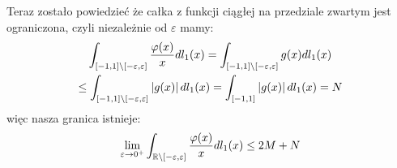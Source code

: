 \documentclass[11pt]{scrartcl}
\begin{document}
\begin{walk}
            Teraz zostało powiedzieć że całka z funkcji ciągłej na przedziale zwartym 
            jest ograniczona, czyli niezależnie od $\varepsilon$ mamy:
            \begin{gather*}
                \int_{[-1,1] \backslash [-\varepsilon, \varepsilon]} \frac{\varphi (x)}{x} dl_1 (x) =
                \int_{[-1,1] \backslash [-\varepsilon, \varepsilon]} g(x) dl_1 (x) \\
                \leq \int_{[-1,1] \backslash [-\varepsilon, \varepsilon]} \left\lvert  g(x) \right\rvert dl_1 (x) =
                \int_{[-1,1]} \left\lvert g(x) \right\rvert dl_1 (x) = N
            \end{gather*}
            więc nasza granica istnieje:
            \begin{gather*}
               \lim_{\varepsilon \to 0^+} \int_{\mathbb R \backslash [-\varepsilon, \varepsilon]} 
                   \frac{\varphi (x)}{x} dl_1 (x) \leq
                2M + N
            \end{gather*}
    \end{walk}
     
 
\end{document}
